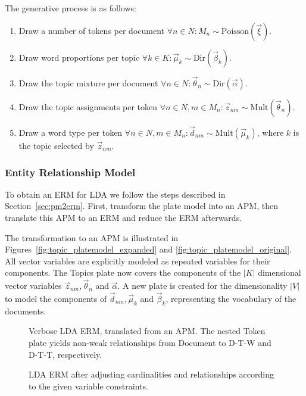 The generative process is as follows:
\begin{enumerate}
\item Draw a number of tokens per document $\forall n \in N: M_n \sim \text{Poisson}(\vec \xi)$.
\item Draw word proportions per topic $\forall k \in K: \vec \mu_k \sim \text{Dir}(\vec \beta_k)$.
\item Draw the topic mixture per document $\forall n \in N: \vec \theta_n \sim \text{Dir}(\vec \alpha)$.
\item Draw the topic assignments per token $\forall n \in N, m \in M_n: \vec z_{nm} \sim \text{Mult}(\vec \theta_n)$.
\item Draw a word type per token $\forall n \in N, m \in M_n: \vec d_{nm} \sim \text{Mult}(\vec \mu_k)$, where $k$ is the topic selected by $\vec z_{nm}$.
\end{enumerate}

\subsubsection{Entity Relationship Model}

To obtain an ERM for LDA we follow the steps described in Section~\ref{sec:pm2erm}. First, transform the plate model into an APM, then translate this APM to an ERM and reduce the ERM afterwards.

The transformation to an APM is illustrated in Figures~\ref{fig:topic_platemodel_expanded} and \ref{fig:topic_platemodel_original}. All vector variables are explicitly modeled as repeated variables for their components. The Topics plate now covers the components of the $|K|$ dimensional vector variables $\vec z_{nm}, \vec \theta_n$ and $\vec \alpha$. A new plate is created for the dimensionality $|V|$ to model the components of $\vec d_{nm}, \vec \mu_k$ and $\vec \beta_k$, representing the vocabulary of the documents.

\begin{figure}[p]
\centering
\scalebox{0.5}{\adjustTikzSize }
\caption[Verbose LDA ERM, translated from an APM]{Verbose LDA ERM, translated from an APM. The nested Token plate yields non-weak relationships from Document to D-T-W and D-T-T, respectively.}\label{fig:topic_erm_good_verbose}
\end{figure}

\begin{figure}[p]
\centering
\scalebox{0.5}{\adjustTikzSize }
\caption[LDA ERM after taking constraints into account]{LDA ERM after adjusting cardinalities and relationships according to the given variable constraints.}\label{fig:topic_erm_good_constraints}
\end{figure}

